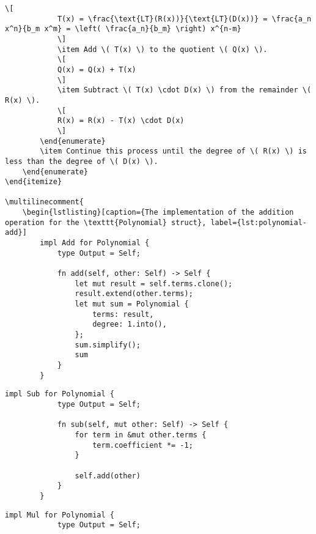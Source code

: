 {\begin{lstlisting}[caption={The implementation of \texttt{PartialEq} for the \texttt{Polynomial} struct}, label={lst:polynomial-eq}]
            \[
            T(x) = \frac{\text{LT}(R(x))}{\text{LT}(D(x))} = \frac{a_n x^n}{b_m x^m} = \left( \frac{a_n}{b_m} \right) x^{n-m}
            \]
            \item Add \( T(x) \) to the quotient \( Q(x) \).
            \[
            Q(x) = Q(x) + T(x)
            \]
            \item Subtract \( T(x) \cdot D(x) \) from the remainder \( R(x) \).
            \[
            R(x) = R(x) - T(x) \cdot D(x)
            \]
        \end{enumerate}
        \item Continue this process until the degree of \( R(x) \) is less than the degree of \( D(x) \).
    \end{enumerate}
\end{itemize}

\multilinecomment{
    \begin{lstlisting}[caption={The implementation of the addition operation for the \texttt{Polynomial} struct}, label={lst:polynomial-add}]
        impl Add for Polynomial {
            type Output = Self;
        
            fn add(self, other: Self) -> Self {
                let mut result = self.terms.clone();
                result.extend(other.terms);
                let mut sum = Polynomial {
                    terms: result,
                    degree: 1.into(),
                };
                sum.simplify();
                sum
            }
        }        
    \end{lstlisting}

    \begin{lstlisting}[caption={The implementation of the subtraction operation for the \texttt{Polynomial} struct}, label={lst:polynomial-sub}]
        impl Sub for Polynomial {
            type Output = Self;
        
            fn sub(self, mut other: Self) -> Self {
                for term in &mut other.terms {
                    term.coefficient *= -1;
                }
        
                self.add(other)
            }
        }        
    \end{lstlisting}

    \begin{lstlisting}[caption={The implementation of the multiplication operation for the \texttt{Polynomial} struct}, label={lst:polynomial-mul}]
        impl Mul for Polynomial {
            type Output = Self;
        

\end{lstlisting}}
